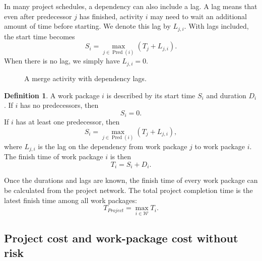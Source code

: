 \documentclass[11pt,a4paper]{article}
\newcommand{\1}{\mathbf{1}}
\newcommand{\Pred}{\operatorname{Pred}}
\theoremstyle{definition}
\newtheorem{definition}{Definition}[section]
\theoremstyle{plain}
\theoremstyle{remark}
\numberwithin{equation}{section}
\begin{document}
In many project schedules, a dependency can also include a lag. A lag means that even after predecessor $j$ has finished, activity $i$ may need to wait an additional amount of time before starting. We denote this lag by $L_{j,i}$. With lags included, the start time becomes
\[
S_i=\max_{j\in\Pred(i)}(T_j+L_{j,i}).
\]
When there is no lag, we simply have $L_{j,i}=0$.

\begin{figure}[H]
\centering
{}
\caption{A merge activity with dependency lags.}
\label{fig:merge-activity-with-lags}
\end{figure}

\begin{definition}
A work package $i$ is described by its start time $S_i$ and duration $D_i$. If $i$ has no predecessors, then
\[
S_i=0.
\]
If $i$ has at least one predecessor, then
\[
S_i=\max_{j\in\Pred(i)}(T_j+L_{j,i}),
\]
where $L_{j,i}$ is the lag on the dependency from work package $j$ to work package $i$. The finish time of work package $i$ is then
\[
T_i=S_i+D_i.
\]
\end{definition}

Once the durations and lags are known, the finish time of every work package can be calculated from the project network. The total project completion time is the latest finish time among all work packages:
\[
T_{Project}=\max_{i\in\mathcal{W}}T_i.
\]

\subsection{Project cost and work-package cost without risk}
\end{document}
